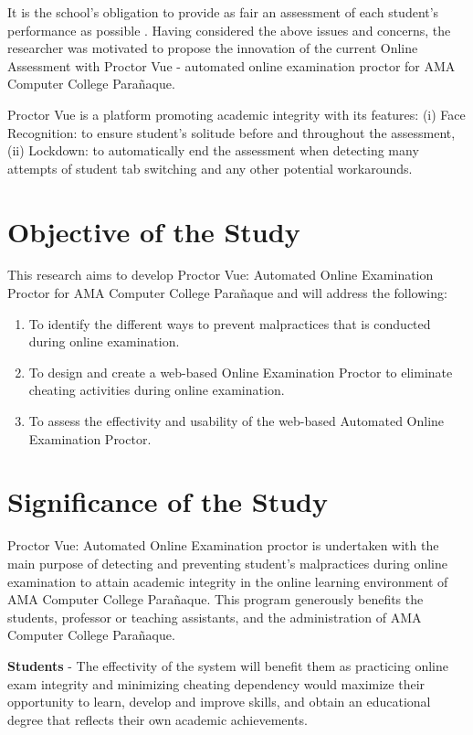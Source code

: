 It is the school’s obligation to provide as fair an assessment of each student’s performance as possible \cite{lundahl2010skolbedomningens}.
Having considered the above issues and concerns, the researcher was motivated to propose the innovation of the current Online Assessment with Proctor Vue - automated online examination proctor for AMA Computer College Parañaque.

Proctor Vue is a platform promoting academic integrity with its features: (i) Face Recognition: to ensure student’s solitude before and throughout the assessment, (ii) Lockdown: to automatically end the assessment when detecting many attempts of student tab switching and any other potential workarounds.

\section{Objective of the Study}
This research aims to develop Proctor Vue: Automated Online Examination Proctor for AMA Computer College Parañaque and will address the following:
\begin{enumerate}
   \item To identify the different ways to prevent malpractices that is conducted during online examination.
   \item To design and create a web-based Online Examination Proctor to eliminate cheating activities during online examination.
   \item To assess the effectivity and usability of the web-based Automated Online Examination Proctor.
\end{enumerate}

\section{Significance of the Study}

Proctor Vue: Automated Online Examination proctor is undertaken with the main purpose of detecting and preventing student’s malpractices during online examination to attain academic integrity in the online learning environment of AMA Computer College Parañaque. This program generously benefits the students, professor or teaching assistants, and the administration of AMA Computer College Parañaque.

\textbf{Students} - The effectivity of the system will benefit them as practicing online exam integrity and minimizing cheating dependency would maximize their opportunity to learn, develop and improve skills, and obtain an educational degree that reflects their own academic achievements.

